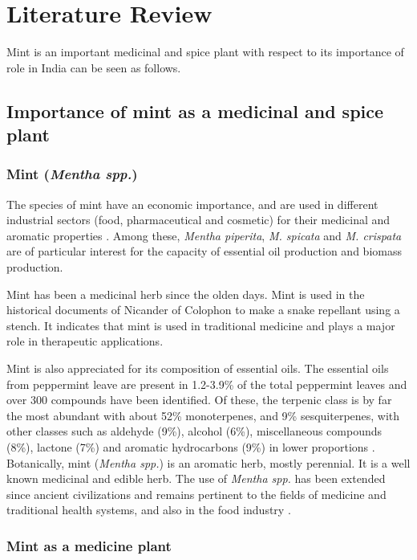 \chapter{Literature Review}

Mint is an important medicinal and spice plant with respect to its importance of role in India can be seen as follows.

\section{Importance of mint as a medicinal and spice plant}

\subsection{Mint (\textit{Mentha spp.})}

The species of mint have an economic importance, and are used in different industrial sectors (food, pharmaceutical and cosmetic) for their medicinal and aromatic properties \parencite{Zheljazkov2020}. Among these, \textit{Mentha piperita}, \textit{M. spicata} and \textit{M. crispata} are of particular interest for the capacity of essential oil production and biomass production.

Mint has been a medicinal herb since the olden days. Mint is used in the historical documents of Nicander of Colophon \textcite{Silva2020} to make a snake repellant using a stench. It indicates that mint is used in traditional medicine and plays a major role in therapeutic applications.

Mint is also appreciated for its composition of essential oils. The essential oils from peppermint leave are present in 1.2-3.9\% of the total peppermint leaves and over 300 compounds have been identified. Of these, the terpenic class is by far the most abundant with about 52\% monoterpenes, and 9\% sesquiterpenes, with other classes such as aldehyde (9\%), alcohol (6\%), miscellaneous compounds (8\%), lactone (7\%) and aromatic hydrocarbons (9\%) in lower proportions \textcite{Silva2020}. Botanically, mint (\textit{Mentha spp.}) is an aromatic herb, mostly perennial. It is a well known medicinal and edible herb. The use of \textit{Mentha spp.} has been extended since ancient civilizations and remains pertinent to the fields of medicine and traditional health systems, and also in the food industry \textcite{Silva2020}.

\subsection{Mint as a medicine plant}

